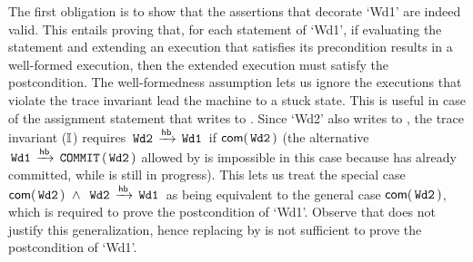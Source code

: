 The first obligation is to show that the assertions that decorate
`Wd1' are indeed valid. This entails proving that, for each statement
of `Wd1', if evaluating the statement and extending an execution that
satisfies its precondition results in a well-formed execution, then
the extended execution must satisfy the postcondition. The
well-formedness assumption lets us ignore the executions that violate
the trace invariant lead the machine to a stuck state. This is useful
in case of the assignment statement that writes  to . Since
`Wd2' also writes to , the trace invariant ($\mathbb{I}$) requires
$\,{\tt Wd2}\, \xrightarrow{\textsf{hb}} \,{\tt Wd1}\,$ if $\textsf{com}(\,{\tt Wd2}\,)$ (the alternative
$\,{\tt Wd1}\, \xrightarrow{\textsf{hb}} \,{\tt COMMIT}\,(\,{\tt Wd2}\,)$ allowed by  is
impossible in this case because  has already committed, while
 is still in progress). This lets us treat the special case
$\textsf{com}(\,{\tt Wd2}\,)~\wedge~ \,{\tt Wd2}\, \xrightarrow{\textsf{hb}} \,{\tt Wd1}\,$ as being equivalent
to the general case $\textsf{com}(\,{\tt Wd2}\,)$, which is required to prove
the postcondition of `Wd1'. Observe that  does not justify
this generalization, hence replacing  by  is not
sufficient to prove the postcondition of `Wd1'.

